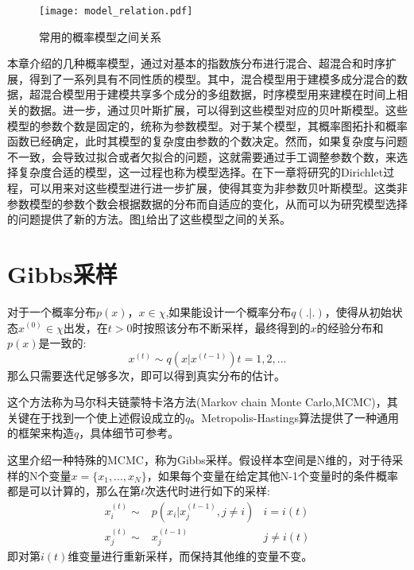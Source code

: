 \begin{figure}
\texttt{[image: model\_relation.pdf]} 
\caption{常用的概率模型之间关系}\label{fig:model_relation}
\end{figure}


本章介绍的几种概率模型，通过对基本的指数族分布进行混合、超混合和时序扩展，得到了一系列具有不同性质的模型。其中，混合模型用于建模多成分混合的数据，超混合模型用于建模共享多个成分的多组数据，时序模型用来建模在时间上相关的数据。进一步，通过贝叶斯扩展，可以得到这些模型对应的贝叶斯模型。这些模型的参数个数是固定的，统称为参数模型。对于某个模型，其概率图拓扑和概率函数已经确定，此时其模型的复杂度由参数的个数决定。然而，如果复杂度与问题不一致，会导致过拟合或者欠拟合的问题，这就需要通过手工调整参数个数，来选择复杂度合适的模型，这一过程也称为模型选择。在下一章将研究的Dirichlet过程，可以用来对这些模型进行进一步扩展，使得其变为非参数贝叶斯模型。这类非参数模型的参数个数会根据数据的分布而自适应的变化，从而可以为研究模型选择的问题提供了新的方法。图\ref{fig:model_relation}给出了这些模型之间的关系。



\section{Gibbs采样}
对于一个概率分布$p(x)$，$x \in \chi$,如果能设计一个概率分布$q(.|.)$，使得从初始状态$x^{(0)} \in \chi$出发，在$t>0$时按照该分布不断采样，最终得到的$x$的经验分布和$p(x)$是一致的:
\begin{equation}
x^{(t)}\sim q(x|x^{(t-1)})    t =1,2,...
\end{equation}
那么只需要迭代足够多次，即可以得到真实分布的估计。

这个方法称为马尔科夫链蒙特卡洛方法(Markov chain Monte Carlo,MCMC)\cite{gilks2005markov}，其关键在于找到一个使上述假设成立的$q$。Metropolis-Hastings算法提供了一种通用的框架来构造$q$，具体细节可参考\cite{chib1995understanding}。

这里介绍一种特殊的MCMC，称为Gibbs采样。假设样本空间是N维的，对于待采样的N个变量$x=\{x_1,...,x_N\}$，如果每个变量在给定其他N-1个变量时的条件概率都是可以计算的，那么在第$t$次迭代时进行如下的采样:
\begin{equation}
\begin{aligned}
x_i^{(t)}\sim & p(x_i|x_j^{(t-1)},j \neq i)    	& i = i(t)\\
x_j^{(t)}\sim & x_j^{(t-1)}						& j \neq i(t)
\end{aligned}
\end{equation}
即对第$i(t)$维变量进行重新采样，而保持其他维的变量不变。


